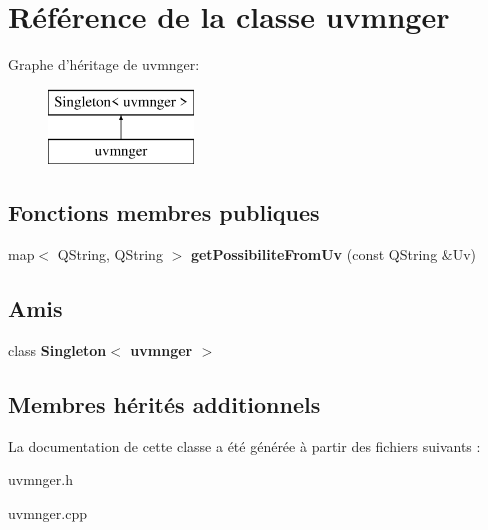 \hypertarget{classuvmnger}{\section{Référence de la classe uvmnger}
\label{classuvmnger}
}
Graphe d'héritage de uvmnger\+:\begin{figure}[H]
\begin{center}
\leavevmode
\includegraphics[height=2.000000cm]{classuvmnger}
\end{center}
\end{figure}
\subsection*{Fonctions membres publiques}
\begin{DoxyCompactItemize}
\item 
\hypertarget{classuvmnger_a16ac6c78fdab0151ec2685a12c78c7e6}{map$<$ Q\+String, Q\+String $>$ {\bfseries get\+Possibilite\+From\+Uv} (const Q\+String \&Uv)}\label{classuvmnger_a16ac6c78fdab0151ec2685a12c78c7e6}

\end{DoxyCompactItemize}
\subsection*{Amis}
\begin{DoxyCompactItemize}
\item 
\hypertarget{classuvmnger_a162f1ec43266b7dc7d1dfcee3c3a6a0e}{class {\bfseries Singleton$<$ uvmnger $>$}}\label{classuvmnger_a162f1ec43266b7dc7d1dfcee3c3a6a0e}

\end{DoxyCompactItemize}
\subsection*{Membres hérités additionnels}


La documentation de cette classe a été générée à partir des fichiers suivants \+:\begin{DoxyCompactItemize}
\item 
uvmnger.\+h\item 
uvmnger.\+cpp\end{DoxyCompactItemize}
